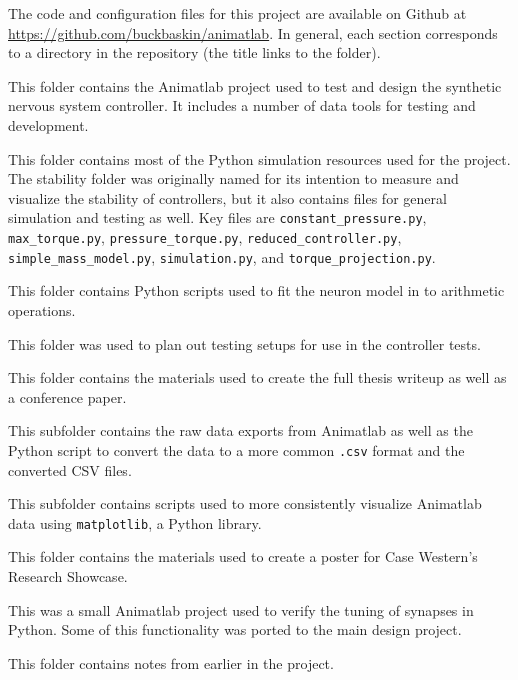 The code and configuration files for this project are available on Github at \url{https://github.com/buckbaskin/animatlab}. In general, each section corresponds to a directory in the repository (the title links to the folder).


This folder contains the Animatlab project used to test and design the synthetic nervous system controller. It includes a number of data tools for testing and development.


This folder contains most of the Python simulation resources used for the project. The stability folder was originally named for its intention to measure and visualize the stability of controllers, but it also contains files for general simulation and testing as well. Key files are \texttt{constant\_pressure.py}, \texttt{max\_torque.py}, \texttt{pressure\_torque.py}, \texttt{reduced\_controller.py}, \texttt{simple\_mass\_model.py}, \texttt{simulation.py}, and \texttt{torque\_projection.py}.


This folder contains Python scripts used to fit the neuron model in \cite{NickFunctionalSubnetwork} to arithmetic operations.


This folder was used to plan out testing setups for use in the controller tests.


This folder contains the materials used to create the full thesis writeup as well as a conference paper.


This subfolder contains the raw data exports from Animatlab as well as the Python script to convert the data to a more common \texttt{.csv} format and the converted CSV files.


This subfolder contains scripts used to more consistently visualize Animatlab data using \texttt{matplotlib}, a Python library.


This folder contains the materials used to create a poster for Case Western's Research Showcase.


This was a small Animatlab project used to verify the tuning of synapses in Python. Some of this functionality was ported to the main design project.


This folder contains notes from earlier in the project.